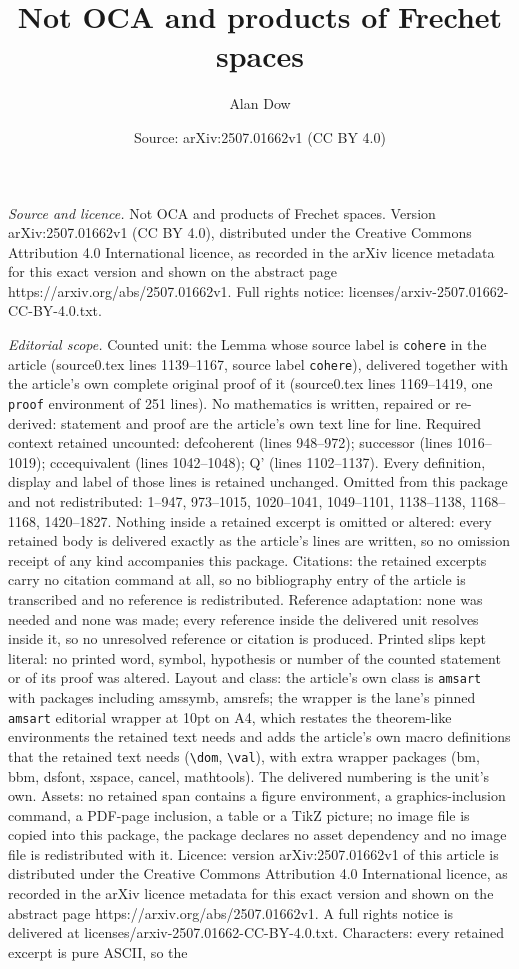 \documentclass[10pt,a4paper]{amsart}
\title[Not OCA and products of Frechet spaces]{Not OCA and products of Frechet spaces}
\author{Alan Dow}
\date{Source: arXiv:2507.01662v1 (CC BY 4.0)}
\begin{document}
\maketitle

\noindent\emph{Source and licence.} Not OCA and products of Frechet spaces. Version arXiv:2507.01662v1 (CC BY 4.0), distributed under the Creative Commons Attribution 4.0 International licence, as recorded in the arXiv licence metadata for this exact version and shown on the abstract page https://arxiv.org/abs/2507.01662v1. Full rights notice: licenses/arxiv-2507.01662-CC-BY-4.0.txt.\par\smallskip

\noindent\textit{Editorial scope.} Counted unit: the Lemma whose source label is \texttt{cohere} in the article (source0.tex lines 1139--1167, source label \texttt{cohere}), delivered together with the article's own complete original proof of it (source0.tex lines 1169--1419, one \texttt{proof} environment of 251 lines). No mathematics is written, repaired or re-derived: statement and proof are the article's own text line for line. Required context retained uncounted: defcoherent (lines 948--972); successor (lines 1016--1019); cccequivalent (lines 1042--1048); Q' (lines 1102--1137). Every definition, display and label of those lines is retained unchanged. Omitted from this package and not redistributed: 1--947, 973--1015, 1020--1041, 1049--1101, 1138--1138, 1168--1168, 1420--1827. Nothing inside a retained excerpt is omitted or altered: every retained body is delivered exactly as the article's lines are written, so no omission receipt of any kind accompanies this package. Citations: the retained excerpts carry no citation command at all, so no bibliography entry of the article is transcribed and no reference is redistributed. Reference adaptation: none was needed and none was made; every reference inside the delivered unit resolves inside it, so no unresolved reference or citation is produced. Printed slips kept literal: no printed word, symbol, hypothesis or number of the counted statement or of its proof was altered. Layout and class: the article's own class is \texttt{amsart} with packages including amssymb, amsrefs; the wrapper is the lane's pinned \texttt{amsart} editorial wrapper at 10pt on A4, which restates the theorem-like environments the retained text needs and adds the article's own macro definitions that the retained text needs (\texttt{\textbackslash dom}, \texttt{\textbackslash val}), with extra wrapper packages (bm, bbm, dsfont, xspace, cancel, mathtools). The delivered numbering is the unit's own. Assets: no retained span contains a figure environment, a graphics-inclusion command, a PDF-page inclusion, a table or a TikZ picture; no image file is copied into this package, the package declares no asset dependency and no image file is redistributed with it. Licence: version arXiv:2507.01662v1 of this article is distributed under the Creative Commons Attribution 4.0 International licence, as recorded in the arXiv licence metadata for this exact version and shown on the abstract page https://arxiv.org/abs/2507.01662v1. A full rights notice is delivered at licenses/arxiv-2507.01662-CC-BY-4.0.txt. Characters: every retained excerpt is pure ASCII, so the 
\end{document}
